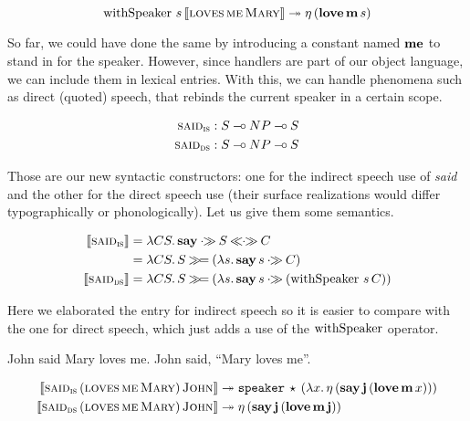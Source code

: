 \documentclass{llncs}
\newcommand{\negSpaceBeforeAlign}{\vspace{-4mm}}
\newcommand{\negSpaceBetweenAlign}{\vspace{-8mm}}
\begin{document}
$$
  \operatorname{withSpeaker}\,s\,\llbracket \textsc{loves}\,\textsc{me}\,\textsc{Mary} \rrbracket \twoheadrightarrow
  \eta\,(\textbf{love}\,\textbf{m}\,s)
$$

So far, we could have done the same by introducing a constant named
$\textbf{me}$ to stand in for the speaker. However, since handlers are part of
our object language, we can include them in lexical entries. With this, we
can handle phenomena such as direct (quoted) speech, that rebinds the
current speaker in a certain scope.

\negSpaceBeforeAlign

\begin{align*}
  \textsc{said}_{\textsc{is}} &: S \mathbin{{-}\mkern-3.5mu{\circ}} NP \mathbin{{-}\mkern-3.5mu{\circ}} S \\
  \textsc{said}_{\textsc{ds}} &: S \mathbin{{-}\mkern-3.5mu{\circ}} NP \mathbin{{-}\mkern-3.5mu{\circ}} S
\end{align*}

Those are our new syntactic constructors: one for the indirect speech use
of \emph{said} and the other for the direct speech use (their surface
realizations would differ typographically or phonologically). Let us give
them some semantics.

\negSpaceBeforeAlign

\begin{align*}
  \sem{\abs{said}_{\abs{is}}} &= \lam{C S}{\obj{say} \apr S \aplr C} \\
                             &= \lam{C S}{S \hsbind (\lam{s}{\ap{\obj{say}}{s} \apr C})} \\
  \sem{\abs{said}_{\abs{ds}}} &= \lam{C S}{S \hsbind (\lam{s}{\ap{\obj{say}}{s} \apr (\app{\withSpeaker}{s}{C})})}
\end{align*}

Here we elaborated the entry for indirect speech so it is easier to compare
with the one for direct speech, which just adds a use of the $\operatorname{withSpeaker}$
operator.

\begin{exe}
  \ex John said Mary loves me. \label{ex:indirect-speech}
  \ex John said, ``Mary loves me''. \label{ex:direct-speech}
\end{exe}

\negSpaceBetweenAlign

\begin{align}
  \llbracket \textsc{said}_{\textsc{is}}\,(\textsc{loves}\,\textsc{me}\,\textsc{Mary})\,\textsc{John} \rrbracket
  & \twoheadrightarrow \mathtt{speaker}\,\star\,(\lambda x.\, \eta\,(\textbf{say}\,\textbf{j}\,(\textbf{love}\,\textbf{m}\,x))) \\
  \llbracket \textsc{said}_{\textsc{ds}}\,(\textsc{loves}\,\textsc{me}\,\textsc{Mary})\,\textsc{John} \rrbracket
  & \twoheadrightarrow \eta\,(\textbf{say}\,\textbf{j}\,(\textbf{love}\,\textbf{m}\,\textbf{j}))
\end{align}
\end{document}
